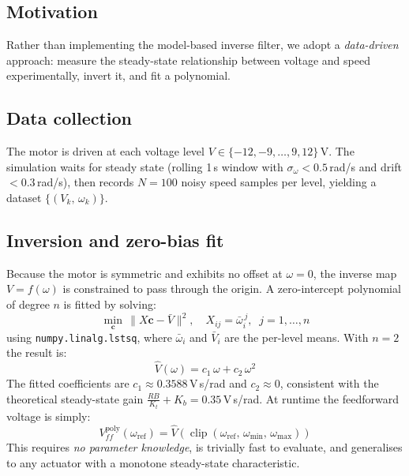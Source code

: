 \documentclass[10pt,twocolumn]{article}
\begin{document}
\subsection{Motivation}
Rather than implementing the model-based inverse filter, we adopt a
\emph{data-driven} approach: measure the steady-state relationship
between voltage and speed experimentally, invert it, and fit a
polynomial.

\subsection{Data collection}
The motor is driven at each voltage level
$V \in \{-12, -9, \ldots, 9, 12\}$\,V.
The simulation waits for steady state (rolling 1\,s window with
$\sigma_\omega < 0.5$\,rad/s and drift $<0.3$\,rad/s), then records
$N=100$ noisy speed samples per level, yielding a dataset
$\{(V_k,\,\omega_k)\}$.

\subsection{Inversion and zero-bias fit}
Because the motor is symmetric and exhibits no offset at $\omega=0$,
the inverse map $V = f(\omega)$ is constrained to pass through the
origin. A zero-intercept polynomial of degree $n$ is fitted by solving:
\begin{equation}
  \min_{\mathbf{c}}\,\bigl\|X\mathbf{c} - \bar{V}\bigr\|^2,\quad
  X_{ij} = \bar{\omega}_i^{\,j},\;\; j=1,\ldots,n
  \label{eq:lstsq}
\end{equation}
using \texttt{numpy.linalg.lstsq}, where $\bar{\omega}_i$ and
$\bar{V}_i$ are the per-level means. With $n=2$ the result is:
\begin{equation}
  \hat{V}(\omega) = c_1\,\omega + c_2\,\omega^2
  \label{eq:poly}
\end{equation}
The fitted coefficients are $c_1 \approx 0.3588$\,V\,s/rad and
$c_2 \approx 0$, consistent with the theoretical steady-state gain
$\tfrac{RB}{K_t}+K_b = 0.35$\,V\,s/rad. At runtime the feedforward
voltage is simply:
\begin{equation}
  V_{ff}^{\mathrm{poly}}(\omega_{\mathrm{ref}})
    = \hat{V}\!\left(\operatorname{clip}(\omega_{\mathrm{ref}},\,
      \omega_{\min},\,\omega_{\max})\right)
  \label{eq:poly_ff}
\end{equation}
This requires \emph{no parameter knowledge}, is trivially fast to
evaluate, and generalises to any actuator with a monotone
steady-state characteristic.
\end{document}
